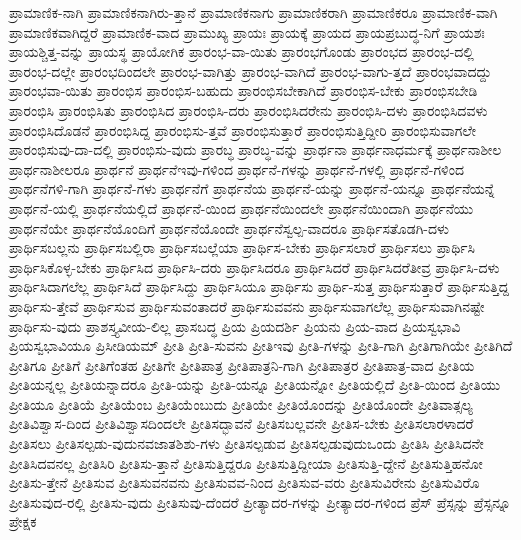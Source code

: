 {ಪ್ರಾಮಾಣಿಕ-ನಾಗಿ
ಪ್ರಾಮಾಣಿಕನಾಗಿರು-ತ್ತಾನೆ
ಪ್ರಾಮಾಣಿಕನಾಗು
ಪ್ರಾಮಾಣಿಕರಾಗಿ
ಪ್ರಾಮಾಣಿಕರೂ
ಪ್ರಾಮಾಣಿಕ-ವಾಗಿ
ಪ್ರಾಮಾಣಿಕವಾಗಿದ್ದರೆ
ಪ್ರಾಮಾಣಿಕ-ವಾದ
ಪ್ರಾಮುಖ್ಯ
ಪ್ರಾಯಃ
ಪ್ರಾಯಕ್ಕೆ
ಪ್ರಾಯದ
ಪ್ರಾಯಪ್ರಬುದ್ಧ-ನಿಗೆ
ಪ್ರಾಯಶಃ
ಪ್ರಾಯಶ್ಚಿತ್ತ-ವನ್ನು
ಪ್ರಾಯಸ್ಥ
ಪ್ರಾಯೋಗಿಕ
ಪ್ರಾರಂಭ-ವಾ-ಯಿತು
ಪ್ರಾರಂಭಗೊಂಡು
ಪ್ರಾರಂಭದ
ಪ್ರಾರಂಭ-ದಲ್ಲಿ
ಪ್ರಾರಂಭ-ದಲ್ಲೇ
ಪ್ರಾರಂಭದಿಂದಲೇ
ಪ್ರಾರಂಭ-ವಾಗಿತ್ತು
ಪ್ರಾರಂಭ-ವಾಗಿದೆ
ಪ್ರಾರಂಭ-ವಾಗು-ತ್ತದೆ
ಪ್ರಾರಂಭವಾದದ್ದು
ಪ್ರಾರಂಭವಾ-ಯಿತು
ಪ್ರಾರಂಭಿಸ
ಪ್ರಾರಂಭಿಸ-ಬಹುದು
ಪ್ರಾರಂಭಿಸಬೇಕಾಗಿದೆ
ಪ್ರಾರಂಭಿಸ-ಬೇಕು
ಪ್ರಾರಂಭಿಸಬೇಡಿ
ಪ್ರಾರಂಭಿಸಿ
ಪ್ರಾರಂಭಿಸಿತು
ಪ್ರಾರಂಭಿಸಿದ
ಪ್ರಾರಂಭಿಸಿ-ದರು
ಪ್ರಾರಂಭಿಸಿದರೇನು
ಪ್ರಾರಂಭಿಸಿ-ದಳು
ಪ್ರಾರಂಭಿಸಿದವಳು
ಪ್ರಾರಂಭಿಸಿದೊಡನೆ
ಪ್ರಾರಂಭಿಸಿದ್ದ
ಪ್ರಾರಂಭಿಸು-ತ್ತವೆ
ಪ್ರಾರಂಭಿಸುತ್ತಾರೆ
ಪ್ರಾರಂಭಿಸುತ್ತಿದ್ದೀರಿ
ಪ್ರಾರಂಭಿಸುವಾಗಲೇ
ಪ್ರಾರಂಭಿಸುವು-ದಾ-ದಲ್ಲಿ
ಪ್ರಾರಂಭಿಸು-ವುದು
ಪ್ರಾರಬ್ಧ
ಪ್ರಾರಬ್ಧ-ವನ್ನು
ಪ್ರಾರ್ಥನಾ
ಪ್ರಾರ್ಥನಾಧರ್ಮಕ್ಕೆ
ಪ್ರಾರ್ಥನಾಶೀಲ
ಪ್ರಾರ್ಥನಾಶೀಲರೂ
ಪ್ರಾರ್ಥನೆ
ಪ್ರಾರ್ಥನೆಇವು-ಗಳಿಂದ
ಪ್ರಾರ್ಥನೆ-ಗಳನ್ನು
ಪ್ರಾರ್ಥನೆ-ಗಳಲ್ಲಿ
ಪ್ರಾರ್ಥನೆ-ಗಳಿಂದ
ಪ್ರಾರ್ಥನೆಗಳಿ-ಗಾಗಿ
ಪ್ರಾರ್ಥನೆ-ಗಳು
ಪ್ರಾರ್ಥನೆಗೆ
ಪ್ರಾರ್ಥನೆಯ
ಪ್ರಾರ್ಥನೆ-ಯನ್ನು
ಪ್ರಾರ್ಥನೆ-ಯನ್ನೂ
ಪ್ರಾರ್ಥನೆಯನ್ನೆ
ಪ್ರಾರ್ಥನೆ-ಯಲ್ಲಿ
ಪ್ರಾರ್ಥನೆಯಲ್ಲಿದೆ
ಪ್ರಾರ್ಥನೆ-ಯಿಂದ
ಪ್ರಾರ್ಥನೆಯಿಂದಲೇ
ಪ್ರಾರ್ಥನೆಯಿಂದಾಗಿ
ಪ್ರಾರ್ಥನೆಯು
ಪ್ರಾರ್ಥನೆಯೇ
ಪ್ರಾರ್ಥನೆಯೊಂದಿಗೆ
ಪ್ರಾರ್ಥನೆಯೊಂದೇ
ಪ್ರಾರ್ಥನೆಸ್ವಲ್ಪ-ವಾದರೂ
ಪ್ರಾರ್ಥಿಸತೊಡಗಿ-ದಳು
ಪ್ರಾರ್ಥಿಸಬಲ್ಲನು
ಪ್ರಾರ್ಥಿಸಬಲ್ಲಿರಾ
ಪ್ರಾರ್ಥಿಸಬಲ್ಲೆಯಾ
ಪ್ರಾರ್ಥಿಸ-ಬೇಕು
ಪ್ರಾರ್ಥಿಸಲಾರೆ
ಪ್ರಾರ್ಥಿಸಲು
ಪ್ರಾರ್ಥಿಸಿ
ಪ್ರಾರ್ಥಿಸಿಕೊಳ್ಳ-ಬೇಕು
ಪ್ರಾರ್ಥಿಸಿದ
ಪ್ರಾರ್ಥಿಸಿ-ದರು
ಪ್ರಾರ್ಥಿಸಿದರೂ
ಪ್ರಾರ್ಥಿಸಿದರೆ
ಪ್ರಾರ್ಥಿಸಿದರೆತೀವ್ರ
ಪ್ರಾರ್ಥಿಸಿ-ದಳು
ಪ್ರಾರ್ಥಿಸಿದಾಗಲೆಲ್ಲ
ಪ್ರಾರ್ಥಿಸಿದೆ
ಪ್ರಾರ್ಥಿಸಿದ್ದು
ಪ್ರಾರ್ಥಿಸಿಯೂ
ಪ್ರಾರ್ಥಿಸು
ಪ್ರಾರ್ಥಿ-ಸುತ್ತ
ಪ್ರಾರ್ಥಿಸುತ್ತಾರೆ
ಪ್ರಾರ್ಥಿಸುತ್ತಿದ್ದ
ಪ್ರಾರ್ಥಿಸು-ತ್ತೇವೆ
ಪ್ರಾರ್ಥಿಸುವ
ಪ್ರಾರ್ಥಿಸುವಂತಾದರೆ
ಪ್ರಾರ್ಥಿಸುವವನು
ಪ್ರಾರ್ಥಿಸುವಾಗಲೆಲ್ಲ
ಪ್ರಾರ್ಥಿಸುವಾಗಿನಷ್ಟೇ
ಪ್ರಾರ್ಥಿಸು-ವುದು
ಪ್ರಾಶಸ್ತ್ಯವೀಯ-ಲಿಲ್ಲ
ಪ್ರಾಸಬದ್ಧ
ಪ್ರಿಯ
ಪ್ರಿಯದರ್ಶಿ
ಪ್ರಿಯನು
ಪ್ರಿಯ-ವಾದ
ಪ್ರಿಯಸ್ವಭಾವಿ
ಪ್ರಿಯಸ್ವಭಾವಿಯೂ
ಪ್ರಿಸೀಡಿಯಮ್
ಪ್ರೀತಿ
ಪ್ರೀತಿ-ಸುವನು
ಪ್ರೀತಿಇವು
ಪ್ರೀತಿ-ಗಳನ್ನು
ಪ್ರೀತಿ-ಗಾಗಿ
ಪ್ರೀತಿಗಾಗಿಯೇ
ಪ್ರೀತಿಗಿದೆ
ಪ್ರೀತಿಗೂ
ಪ್ರೀತಿಗೆ
ಪ್ರೀತಿಗೆಂತಹ
ಪ್ರೀತಿಗೇ
ಪ್ರೀತಿಪಾತ್ರ
ಪ್ರೀತಿಪಾತ್ರನಿ-ಗಾಗಿ
ಪ್ರೀತಿಪಾತ್ರರ
ಪ್ರೀತಿಪಾತ್ರ-ವಾದ
ಪ್ರೀತಿಯ
ಪ್ರೀತಿಯನ್ನಲ್ಲ
ಪ್ರೀತಿಯನ್ನಾದರೂ
ಪ್ರೀತಿ-ಯನ್ನು
ಪ್ರೀತಿ-ಯನ್ನೂ
ಪ್ರೀತಿಯನ್ನೋ
ಪ್ರೀತಿಯಲ್ಲಿದೆ
ಪ್ರೀತಿ-ಯಿಂದ
ಪ್ರೀತಿಯು
ಪ್ರೀತಿಯೂ
ಪ್ರೀತಿಯೆ
ಪ್ರೀತಿಯೆಂಬ
ಪ್ರೀತಿಯೆಂಬುದು
ಪ್ರೀತಿಯೇ
ಪ್ರೀತಿಯೊಂದನ್ನು
ಪ್ರೀತಿಯೊಂದೇ
ಪ್ರೀತಿವಾತ್ಸಲ್ಯ
ಪ್ರೀತಿವಿಶ್ವಾಸ-ದಿಂದ
ಪ್ರೀತಿವಿಶ್ವಾಸದಿಂದಲೇ
ಪ್ರೀತಿಸದ್ಭಾವನೆ
ಪ್ರೀತಿಸಬಲ್ಲವನೇ
ಪ್ರೀತಿಸ-ಬೇಕು
ಪ್ರೀತಿಸಲಾರಳಾದರೆ
ಪ್ರೀತಿಸಲು
ಪ್ರೀತಿಸಲ್ಪಡು-ವುದುನವಜಾತಶಿಶು-ಗಳು
ಪ್ರೀತಿಸಲ್ಪಡುವ
ಪ್ರೀತಿಸಲ್ಪಡುವುದುಒಂದು
ಪ್ರೀತಿಸಿ
ಪ್ರೀತಿಸಿದನೇ
ಪ್ರೀತಿಸಿದವನಲ್ಲ
ಪ್ರೀತಿಸಿರಿ
ಪ್ರೀತಿಸು-ತ್ತಾನೆ
ಪ್ರೀತಿಸುತ್ತಿದ್ದರೂ
ಪ್ರೀತಿಸುತ್ತಿದ್ದೀಯಾ
ಪ್ರೀತಿಸುತ್ತಿ-ದ್ದೇನೆ
ಪ್ರೀತಿಸುತ್ತಿಹನೋ
ಪ್ರೀತಿಸು-ತ್ತೇನೆ
ಪ್ರೀತಿಸುವ
ಪ್ರೀತಿಸುವನವನು
ಪ್ರೀತಿಸುವವ-ನಿಂದ
ಪ್ರೀತಿಸುವ-ವರು
ಪ್ರೀತಿಸುವಿರೇನು
ಪ್ರೀತಿಸುವಿರೊ
ಪ್ರೀತಿಸುವುದ-ರಲ್ಲಿ
ಪ್ರೀತಿಸು-ವುದು
ಪ್ರೀತಿಸುವು-ದೆಂದರೆ
ಪ್ರೀತ್ಯಾದರ-ಗಳನ್ನು
ಪ್ರೀತ್ಯಾದರ-ಗಳಿಂದ
ಪ್ರೆಸ್
ಪ್ರೆಸ್ಸನ್ನು
ಪ್ರೆಸ್ಸನ್ನೂ
ಪ್ರೇಕ್ಷಕ
}
